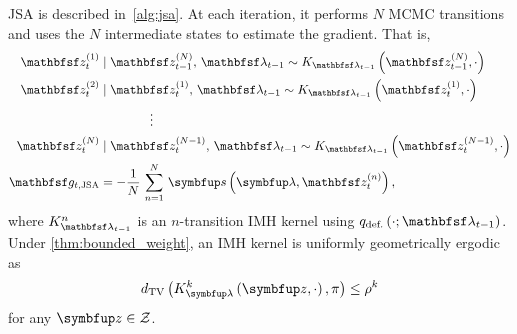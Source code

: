 \begin{proofEnd}

  JSA is described in~\cref{alg:jsa}. 
  At each iteration, it performs \(N\) MCMC transitions and uses the \(N\) intermediate states to estimate the gradient.
  That is,
  \begin{align*}
    \rvvz^{(1)}_{t} &\mid \rvvz_{t-1}^{(N)},\, \rvvlambda_{t-1} \sim K_{\rvvlambda_{t-1}}\left(\rvvz_{t-1}^{(N)}, \cdot\right) \\
    \rvvz^{(2)}_{t} &\mid \rvvz^{(1)}_{t},\, \rvvlambda_{t-1}  \sim K_{\rvvlambda_{t-1}}\left(\rvvz_{t}^{(1)}, \cdot\right) \\
    &\qquad\qquad\vdots
    \\
    \rvvz^{(N)}_{t} &\mid \rvvz^{(N-1)}_{t},\, \rvvlambda_{t-1}  \sim K_{\rvvlambda_{t-1}}\left(\rvvz_{t}^{(N-1)}, \cdot\right)
    \\
    \rvvg_{t,\text{JSA}}  &= -\frac{1}{N}\,\sum^{N}_{n=1} \, \vs\left(\vlambda, \rvvz^{(n)}_t\right),
  \end{align*}
  where \(K_{\rvvlambda_{t-1}}^n\) is an \(n\)-transition IMH kernel using \(q_{\text{def.}}\left(\cdot; \rvvlambda_{t-1}\right)\).
  Under \cref{thm:bounded_weight}, an IMH kernel is uniformly geometrically ergodic~\citep{10.2307/2242610, wang_exact_2020} as
  \begin{align}
    \DTV{K_{\vlambda}^k\left(\vz, \cdot\right)}{\pi} \leq \rho^{k}\label{eq:imh_ergodicity}
  \end{align}
  for any \(\vz \in \mathcal{Z}\).


\end{proofEnd}
